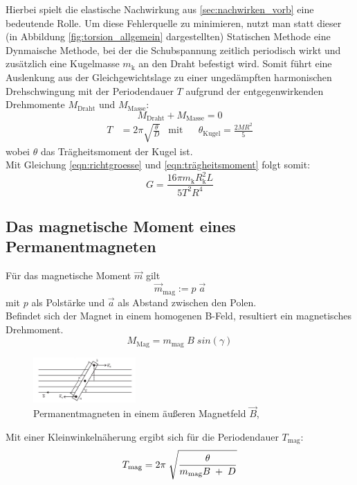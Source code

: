 Hierbei spielt die elastische Nachwirkung aus \ref{sec:nachwirken_vorb} eine bedeutende Rolle.
Um diese Fehlerquelle zu minimieren, nutzt man statt dieser (in Abbildung \ref{fig:torsion_allgemein} dargestellten) 
Statischen Methode eine Dynmaische
Methode, bei der die Schubspannung zeitlich periodisch wirkt und zusätzlich eine Kugelmasse $m_\text{k}$ 
an den Draht befestigt wird.
\newpage
Somit führt eine Auslenkung aus der Gleichgewichtslage zu einer ungedämpften harmonischen
Drehschwingung mit der Periodendauer $T$ aufgrund der entgegenwirkenden Drehmomente $M_\text{Draht}$ 
und $M_\text{Masse}$:
\begin{equation}
    M_\text{Draht} + M_\text{Masse} = 0
\end{equation}
\begin{align}
    T & = 2\pi \sqrt{\frac{\theta}{D}} & \mathrm{mit} & &  \theta_\text{Kugel} = \frac{2MR^2}{5}
    \label{eqn:trägheitsmoment}
\end{align}
wobei $\theta$ das Trägheitsmoment der Kugel ist.\\

Mit Gleichung \ref{eqn:richtgroesse} und \ref{eqn:trägheitsmoment} folgt somit:
\begin{equation}
    G=\frac{16 \pi m_\text{k}R^2_\text{k}L}{5T^2R^4}
    \label{eqn:schubmodul_formel}
\end{equation}


\subsection{Das magnetische Moment eines Permanentmagneten}
Für das magnetische Moment $\vec{m}$ gilt
\begin{equation}
    \vec{m}_\text{mag}:=p\;\vec{a}
\end{equation}
mit $p$ als Polstärke und $\vec{a}$ als Abstand zwischen den Polen.\\
Befindet sich der Magnet in einem homogenen B-Feld, resultiert ein magnetisches Drehmoment.
\begin{equation}
    M_\text{Mag} = m_\text{mag}\;B\;sin(\gamma)
\end{equation}

\begin{figure}[h]
    \centering
    \includegraphics[width=0.35\textwidth, height=0.15\textwidth]{bilder/Drehmoment.jpg}
    \caption{Permanentmagneten in einem äußeren Magnetfeld $\vec{B}$,\cite[12]{Anleitung}}        
    \label{fig:drehmoment}
\end{figure}

Mit einer Kleinwinkelnäherung ergibt sich für die Periodendauer $T_\text{mag}$:
\begin{equation}
    T_\text{mag} = 2\pi\;\sqrt{\frac{\theta}{m_\text{mag}B\;+\;D}}\\
    \label{eqn:periode}
\end{equation}

